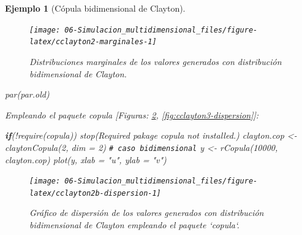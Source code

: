 \documentclass[
]{book}
\newenvironment{Shaded}{\begin{snugshade}}{\end{snugshade}}
\newcommand{\AttributeTok}[1]{\textcolor[rgb]{0.77,0.63,0.00}{#1}}
\newcommand{\CommentTok}[1]{\textcolor[rgb]{0.56,0.35,0.01}{\textit{#1}}}
\newcommand{\ControlFlowTok}[1]{\textcolor[rgb]{0.13,0.29,0.53}{\textbf{#1}}}
\newcommand{\DecValTok}[1]{\textcolor[rgb]{0.00,0.00,0.81}{#1}}
\newcommand{\FunctionTok}[1]{\textcolor[rgb]{0.00,0.00,0.00}{#1}}
\newcommand{\NormalTok}[1]{#1}
\newcommand{\OtherTok}[1]{\textcolor[rgb]{0.56,0.35,0.01}{#1}}
\newcommand{\SpecialCharTok}[1]{\textcolor[rgb]{0.00,0.00,0.00}{#1}}
\newcommand{\StringTok}[1]{\textcolor[rgb]{0.31,0.60,0.02}{#1}}
\theoremstyle{break}
\newtheorem{example}{Ejemplo}[chapter]
\theoremstyle{nonumberplain}
\renewcommand{\CommentTok}[1]{\textcolor[rgb]{0.41,0.41,0.41}{\texttt{#1}}}
\begin{document}
\begin{example}[Cópula bidimensional de Clayton]
\begin{figure}[!htb]

{\centering \texttt{[image: 06-Simulacion\_multidimensional\_files/figure-latex/cclayton2-marginales-1]} 

}

\caption{Distribuciones marginales de los valores generados con distribución bidimensional de Clayton.}\label{fig:cclayton2-marginales}
\end{figure}

\begin{Shaded}
\begin{Highlighting}[]
\FunctionTok{par}\NormalTok{(par.old)}
\end{Highlighting}
\end{Shaded}

Empleando el paquete \emph{copula} {[}Figuras: \ref{fig:cclayton2b-dispersion}, \ref{fig:cclayton3-dispersion}{]}:

\begin{Shaded}
\begin{Highlighting}[]
\ControlFlowTok{if}\NormalTok{(}\SpecialCharTok{!}\FunctionTok{require}\NormalTok{(copula)) }\FunctionTok{stop}\NormalTok{(}\StringTok{\textquotesingle{}Required pakage \textasciigrave{}copula\textasciigrave{} not installed.\textquotesingle{}}\NormalTok{)}
\NormalTok{clayton.cop }\OtherTok{\textless{}{-}} \FunctionTok{claytonCopula}\NormalTok{(}\DecValTok{2}\NormalTok{, }\AttributeTok{dim =} \DecValTok{2}\NormalTok{) }\CommentTok{\# caso bidimensional}
\NormalTok{y }\OtherTok{\textless{}{-}} \FunctionTok{rCopula}\NormalTok{(}\DecValTok{10000}\NormalTok{, clayton.cop)}
\FunctionTok{plot}\NormalTok{(y, }\AttributeTok{xlab =} \StringTok{"u"}\NormalTok{, }\AttributeTok{ylab =} \StringTok{"v"}\NormalTok{)}
\end{Highlighting}
\end{Shaded}

\begin{figure}[!htb]

{\centering \texttt{[image: 06-Simulacion\_multidimensional\_files/figure-latex/cclayton2b-dispersion-1]} 

}

\caption{Gráfico de dispersión de los valores generados con distribución bidimensional de Clayton empleando el paquete `copula`.}\label{fig:cclayton2b-dispersion}
\end{figure}


\end{example}
\end{document}
